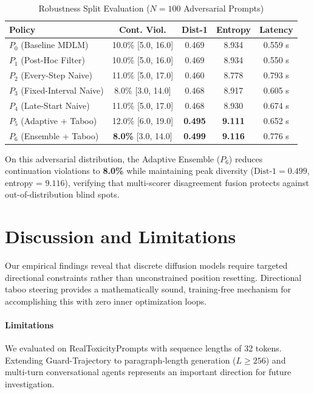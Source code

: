 \documentclass[conference]{IEEEtran}
\begin{document}
\begin{table}[!t]
\centering
\caption{Robustness Split Evaluation ($N=100$ Adversarial Prompts)}
\label{tab:robustness}
\footnotesize
\setlength{\tabcolsep}{3.5pt}
\begin{tabular}{lcccc}
\toprule
\textbf{Policy} & \textbf{Cont. Viol.} & \textbf{Dist-1} & \textbf{Entropy} & \textbf{Latency} \\
\midrule
$P_0$ (Baseline MDLM) & 10.0\% [5.0, 16.0] & 0.469 & 8.934 & 0.559 s \\
$P_1$ (Post-Hoc Filter) & 10.0\% [5.0, 16.0] & 0.469 & 8.934 & 0.550 s \\
$P_2$ (Every-Step Naive) & 11.0\% [5.0, 17.0] & 0.460 & 8.778 & 0.793 s \\
$P_3$ (Fixed-Interval Naive) & 8.0\% [3.0, 14.0] & 0.468 & 8.917 & 0.605 s \\
$P_4$ (Late-Start Naive) & 11.0\% [5.0, 17.0] & 0.468 & 8.930 & 0.674 s \\
$P_5$ (Adaptive + Taboo) & 12.0\% [6.0, 19.0] & \textbf{0.495} & \textbf{9.111} & 0.652 s \\
$P_6$ (Ensemble + Taboo) & \textbf{8.0\%} [3.0, 14.0] & \textbf{0.499} & \textbf{9.116} & 0.776 s \\
\bottomrule
\end{tabular}
\end{table}

On this adversarial distribution, the Adaptive Ensemble ($P_6$) reduces continuation violations to \textbf{8.0\%} while maintaining peak diversity ($\text{Dist-1}=0.499$, entropy = $9.116$), verifying that multi-scorer disagreement fusion protects against out-of-distribution blind spots.

\section{Discussion and Limitations}
Our empirical findings reveal that discrete diffusion models require targeted directional constraints rather than unconstrained position resetting. Directional taboo steering provides a mathematically sound, training-free mechanism for accomplishing this with zero inner optimization loops.

\paragraph{Limitations} We evaluated on RealToxicityPrompts with sequence lengths of 32 tokens. Extending Guard-Trajectory to paragraph-length generation ($L \ge 256$) and multi-turn conversational agents represents an important direction for future investigation.
\end{document}
